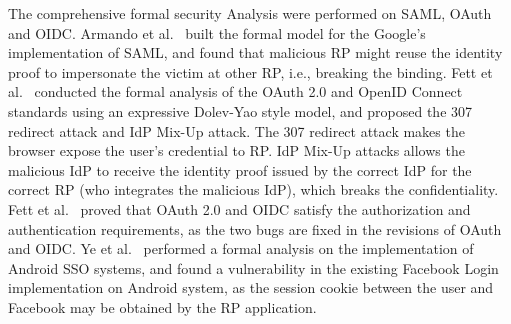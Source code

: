 The comprehensive formal security Analysis were performed on SAML, OAuth and OIDC. Armando et al.~\cite{ArmandoCCCT08} built the formal model for the Google's implementation of SAML, 
and found that  malicious RP might reuse the identity proof to impersonate the victim at other RP, i.e., breaking the binding.
Fett et al.~\cite{FettKS16, FettKS17} conducted the formal analysis of the OAuth 2.0 and OpenID Connect standards using an expressive Dolev-Yao style model, 
and proposed the 307 redirect attack and IdP Mix-Up attack.
The 307 redirect attack makes the browser expose the user's  credential to RP.
IdP Mix-Up attacks allows the malicious IdP to receive the identity proof issued by the correct IdP for the correct RP (who integrates the malicious IdP), which breaks the confidentiality.
Fett et al.~\cite{FettKS16, FettKS17} proved that OAuth 2.0 and OIDC  satisfy the authorization and authentication requirements, as the two bugs are fixed in the revisions of OAuth and OIDC.
Ye et al.~\cite{YeBWD15} performed a formal analysis on the implementation of Android SSO systems,
 and found a vulnerability in the existing Facebook Login implementation on Android system, as the session cookie between the user and Facebook may be obtained by the RP application.



